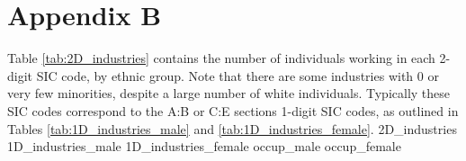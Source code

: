 \documentclass[class=article, crop=false]{standalone}
\begin{document}
\section{Appendix B}
\label{sec:appendixB}
Table \ref{tab:2D_industries} contains the number of individuals working in each 2-digit SIC code, by ethnic group. Note that there are some industries with 0 or very few minorities, despite a large number of white individuals. Typically these SIC codes correspond to the A:B or C:E sections 1-digit SIC codes, as outlined in Tables \ref{tab:1D_industries_male} and \ref{tab:1D_industries_female}. 
{2D_industries}
\restoregeometry
{1D_industries_male}
{1D_industries_female}
{occup_male} %
{occup_female} %
\doublespacing

\ifstandalone

\fi
\end{document}
